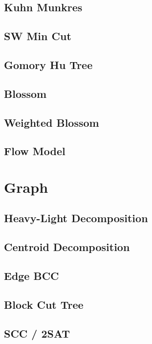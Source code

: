 \subsection{Kuhn Munkres}

\subsection{SW Min Cut}

\subsection{Gomory Hu Tree}

\subsection{Blossom}

\subsection{Weighted Blossom}

\subsection{Flow Model}


\section{Graph}
\subsection{Heavy-Light Decomposition}

\subsection{Centroid Decomposition}

\subsection{Edge BCC}

\subsection{Block Cut Tree}

\subsection{SCC / 2SAT}


